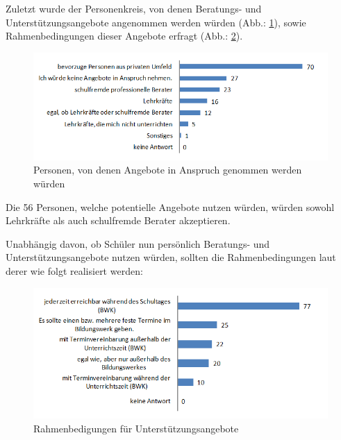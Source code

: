 Zuletzt wurde der Personenkreis, von denen Beratungs- und Unterstützungsangebote angenommen werden würden (Abb.: \ref{fig:Von-welchen-Personen-wuerden-unterstuetzende-Angebote-angenommen}), sowie Rahmenbedingungen dieser Angebote erfragt (Abb.: \ref{fig:Rahmenbedingungen-fuer-Unterstuetzungangebote}). 

\begin{figure}[ht]
	\centering
		\includegraphics[width=1.0\textwidth]{images/Von-welchen-Personen-wuerden-unterstuetzende-Angebote-angenommen.png}
	\caption{Personen, von denen Angebote in Anspruch genommen werden würden}
	\label{fig:Von-welchen-Personen-wuerden-unterstuetzende-Angebote-angenommen}
\end{figure}

\noindent
Die 56 Personen, welche potentielle Angebote nutzen würden, würden sowohl Lehr\-kräf\-te als auch schulfremde Berater akzeptieren. 

Unabhängig davon, ob Schüler nun persönlich Beratungs- und Un\-ter\-stütz\-ungs\-an\-ge\-bo\-te nutzen würden, sollten die Rahmenbedingungen laut derer wie folgt realisiert werden:

\begin{figure}[ht]
	\centering
		\includegraphics[width=1.0\textwidth]{images/Rahmenbedingungen-fuer-Unterstuetzungangebote.png}
	\caption{Rahmenbedigungen für Unterstützungsangebote}
	\label{fig:Rahmenbedingungen-fuer-Unterstuetzungangebote}
\end{figure}

